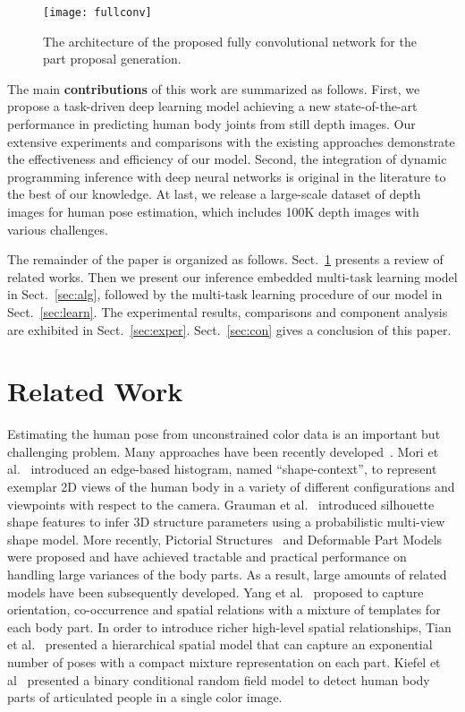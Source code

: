 \documentclass{sig-alternate-05-2015}
\begin{document}
\begin{figure*}[!htb]
\centering
\texttt{[image: fullconv]}
\caption{The architecture of the proposed fully convolutional network for the part proposal generation.}\label{fig:fullconv}
\end{figure*}

The main \textbf{contributions} of this work are summarized as follows. First, we propose a task-driven deep learning model achieving a new state-of-the-art performance in predicting human body joints from still depth images. Our extensive experiments and comparisons with the existing approaches demonstrate the effectiveness and efficiency of our model. Second, the integration of dynamic programming inference with deep neural networks is original in the literature to the best of our knowledge. At last, we release a large-scale dataset of depth images for human pose estimation, which includes 100K depth images with various challenges.

The remainder of the paper is organized as follows. Sect.~\ref{sec:related} presents a review of related works. Then we present our inference embedded multi-task learning model in Sect.~\ref{sec:alg}, followed by the multi-task learning procedure of our model in Sect.~\ref{sec:learn}. The experimental results, comparisons and component analysis are exhibited in Sect.~\ref{sec:exper}. Sect.~\ref{sec:con} gives a conclusion of this paper.


\section{Related Work}
\label{sec:related}
Estimating the human pose from unconstrained color data is an important but challenging problem. Many approaches have been recently developed~\cite{cp80pami, shape02eccv, ia11cvpr, si03iccv, mengwang1, mengwang2, 14icme, xiaodan15iccv, xiaodan16cvpr, robust}. Mori et al.~\cite{shape02eccv} introduced an edge-based histogram, named ``shape-context'', to represent exemplar 2D views of the human body in a variety of different configurations and viewpoints with respect to the camera. Grauman et al.~\cite{si03iccv} introduced silhouette shape features to infer 3D structure parameters using a probabilistic multi-view shape model. More recently, Pictorial Structures~\cite{ps73tc, em00cvpr} and Deformable Part Models~\cite{dpm10pami, stc13acmmm, aom15pami} were proposed and have achieved tractable and practical performance on handling large variances of the body parts. As a result, large amounts of related models have been subsequently developed. Yang et al.~\cite{mof13pami} proposed to capture orientation, co-occurrence and spatial relations with a mixture of templates for each body part. In order to introduce richer high-level spatial relationships, Tian et al.~\cite{hmm12eccv} presented a hierarchical spatial model that can capture an exponential number of poses with a compact mixture representation on each part. Kiefel et al~\cite{fp14eccv} presented a binary conditional random field model to detect human body parts of articulated people in a single color image. 
\end{document}

